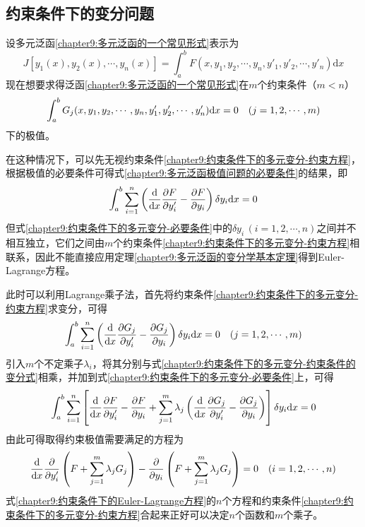 \subsection{约束条件下的变分问题}

设多元泛函\eqref{chapter9:多元泛函的一个常见形式}表示为
\begin{equation*}
	J[y_1(x),y_2(x),\cdots,y_n(x)] = \int_a^b F(x,y_1,y_2,\cdots,y_n,y'_1,y'_2,\cdots,y'_n) \mathrm{d} x
\end{equation*}
现在想要求得泛函\eqref{chapter9:多元泛函的一个常见形式}在$m$个约束条件（$m<n$）
\begin{equation}
	\int_a^b G_j(x,y_1,y_2,\cdots,y_n,y_1',y_2',\cdots,y_n')\mathrm{d} x = 0\quad (j=1,2,\cdots,m)
	\label{chapter9:约束条件下的多元变分-约束方程}
\end{equation}
下的极值。

在这种情况下，可以先无视约束条件\eqref{chapter9:约束条件下的多元变分-约束方程}，根据极值的必要条件可得式\eqref{chapter9:多元泛函极值问题的必要条件}的结果，即
\begin{equation}
	\int_a^b \sum_{i=1}^n \left(\frac{\mathrm{d}}{\mathrm{d} x} \frac{\partial F}{\partial y'_i} - \frac{\partial F}{\partial y_i}\right) \delta y_i \mathrm{d} x = 0
	\label{chapter9:约束条件下的多元变分-必要条件}
\end{equation}
但式\eqref{chapter9:约束条件下的多元变分-必要条件}中的$\delta y_i\,(i=1,2,\cdots,n)$之间并不相互独立，它们之间由$m$个约束条件\eqref{chapter9:约束条件下的多元变分-约束方程}相联系，因此不能直接应用定理\ref{chapter9:多元泛函的变分学基本定理}得到Euler-Lagrange方程。

此时可以利用Lagrange乘子法，首先将约束条件\eqref{chapter9:约束条件下的多元变分-约束方程}求变分，可得
\begin{equation}
	\int_a^b \sum_{i=1}^n \left(\frac{\mathrm{d}}{\mathrm{d} x} \frac{\partial G_j}{\partial y'_i} - \frac{\partial G_j}{\partial y_i}\right) \delta y_i \mathrm{d} x = 0\quad (j=1,2,\cdots,m)
	\label{chapter9:约束条件下的多元变分-约束条件的变分式}
\end{equation}
引入$m$个不定乘子$\lambda_i$，将其分别与式\eqref{chapter9:约束条件下的多元变分-约束条件的变分式}相乘，并加到式\eqref{chapter9:约束条件下的多元变分-必要条件}上，可得
\begin{equation}
	\int_a^b \sum_{i=1}^n \left[\frac{\mathrm{d}}{\mathrm{d} x} \frac{\partial F}{\partial y'_i} - \frac{\partial F}{\partial y_i} + \sum_{j=1}^m\lambda_j\left(\frac{\mathrm{d}}{\mathrm{d} x} \frac{\partial G_j}{\partial y'_i} - \frac{\partial G_j}{\partial y_i}\right)\right] \delta y_i \mathrm{d} x = 0
\end{equation}
由此可得取得约束极值需要满足的方程为
\begin{equation}
	\frac{\mathrm{d}}{\mathrm{d} x} \frac{\partial}{\partial y'_i}\left(F+\sum_{j=1}^m\lambda_jG_j\right) - \frac{\partial}{\partial y_i}\left(F+\sum_{j=1}^m\lambda_jG_j\right) = 0 \quad (i=1,2,\cdots,n)
	\label{chapter9:约束条件下的Euler-Lagrange方程}
\end{equation}
式\eqref{chapter9:约束条件下的Euler-Lagrange方程}的$n$个方程和约束条件\eqref{chapter9:约束条件下的多元变分-约束方程}合起来正好可以决定$n$个函数和$m$个乘子。

